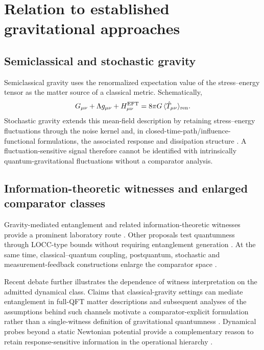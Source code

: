 \documentclass[12pt]{article}
\begin{document}
\section{Relation to established gravitational approaches}

\subsection{Semiclassical and stochastic gravity}

Semiclassical gravity uses the renormalized expectation value of the stress--energy tensor as the matter source of a classical metric. Schematically,
\begin{equation}
 G_{\mu\nu}+\Lambda g_{\mu\nu}+H^{\rm EFT}_{\mu\nu}
 =8\pi G\,\langle \hat T_{\mu\nu}\rangle_{\rm ren}.
\end{equation}
Stochastic gravity extends this mean-field description by retaining stress--energy fluctuations through the noise kernel and, in closed-time-path/influence-functional formulations, the associated response and dissipation structure \cite{HuVerdaguer2008}. A fluctuation-sensitive signal therefore cannot be identified with intrinsically quantum-gravitational fluctuations without a comparator analysis.

\subsection{Information-theoretic witnesses and enlarged comparator classes}

Gravity-mediated entanglement and related information-theoretic witnesses provide a prominent laboratory route \cite{BoseEtAl2017,MarlettoVedral2017,MarlettoVedral2020,MarlettoVedral2025RMP}. Other proposals test quantumness through LOCC-type bounds without requiring entanglement generation \cite{LamiPedernalesPlenio2024}. At the same time, classical--quantum coupling, postquantum, stochastic and measurement-feedback constructions enlarge the comparator space \cite{Oppenheim2023,GalleyGiacominiSelby2023,OppenheimEtAl2023,Diosi2025,MikiEtAl2025}.

Recent debate further illustrates the dependence of witness interpretation on the admitted dynamical class. Claims that classical-gravity settings can mediate entanglement in full-QFT matter descriptions and subsequent analyses of the assumptions behind such channels motivate a comparator-explicit formulation rather than a single-witness definition of gravitational quantumness \cite{AzizHowl2025,FengVedralMarletto2026}. Dynamical probes beyond a static Newtonian potential provide a complementary reason to retain response-sensitive information in the operational hierarchy \cite{ChenGiacomini2025}.
\end{document}
